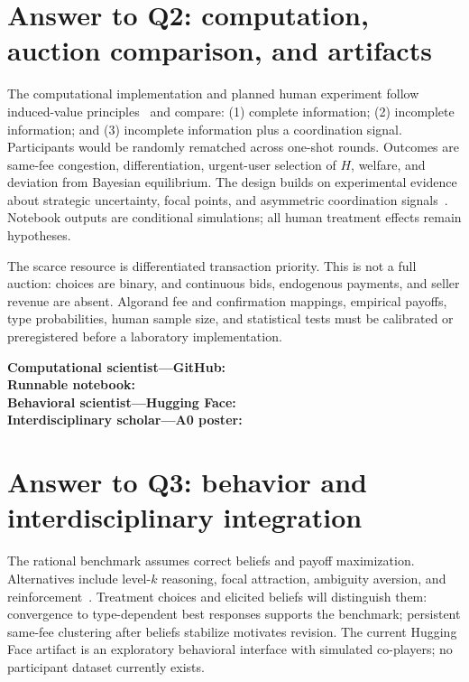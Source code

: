 \section{Answer to Q2: computation, auction comparison, and artifacts}
The computational implementation and planned human experiment follow induced-value principles~\cite{smith1976} and compare: (1) complete information; (2) incomplete information; and (3) incomplete information plus a coordination signal. Participants would be randomly rematched across one-shot rounds. Outcomes are same-fee congestion, differentiation, urgent-user selection of $H$, welfare, and deviation from Bayesian equilibrium. The design builds on experimental evidence about strategic uncertainty, focal points, and asymmetric coordination signals~\cite{vanhuyck1990,crawford2008,agranov2012}. Notebook outputs are conditional simulations; all human treatment effects remain hypotheses.

The scarce resource is differentiated transaction priority. This is not a full auction: choices are binary, and continuous bids, endogenous payments, and seller revenue are absent. Algorand fee and confirmation mappings, empirical payoffs, type probabilities, human sample size, and statistical tests must be calibrated or preregistered before a laboratory implementation.

\textbf{Computational scientist---GitHub:} \GitHubLink\\
\textbf{Runnable notebook:} \NotebookLink\\
\textbf{Behavioral scientist---Hugging Face:} \HuggingFaceLink\\
\textbf{Interdisciplinary scholar---A0 poster:} \PosterLink

\clearpage\balance
\section{Answer to Q3: behavior and interdisciplinary integration}
The rational benchmark assumes correct beliefs and payoff maximization. Alternatives include level-$k$ reasoning, focal attraction, ambiguity aversion, and reinforcement~\cite{camerer2003,zhu2025}. Treatment choices and elicited beliefs will distinguish them: convergence to type-dependent best responses supports the benchmark; persistent same-fee clustering after beliefs stabilize motivates revision. The current Hugging Face artifact is an exploratory behavioral interface with simulated co-players; no participant dataset currently exists.

